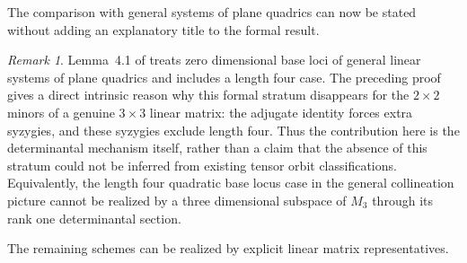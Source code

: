 \documentclass[11pt]{amsart}
\newcommand{\chg}[1]{#1}
\newcommand{\newrev}[1]{#1}
\theoremstyle{plain}
\theoremstyle{definition}
\theoremstyle{remark}
\newtheorem{remark}[theorem]{Remark}
\begin{document}
\chg{The comparison with general systems of plane quadrics can now be stated without adding an explanatory title to the formal result.}

\begin{remark}\label{rem:length-four}
Lemma~4.1 of \cite{GesmundoKeneshlou2026} treats \chg{zero dimensional} base loci of general linear systems of plane quadrics and includes a length four case. The preceding proof \newrev{gives a direct intrinsic reason} why this formal stratum disappears for the $2\times2$ minors of a genuine $3\times3$ linear matrix: the adjugate identity forces extra syzygies, and these syzygies exclude length four. \newrev{Thus the contribution here is the determinantal mechanism itself, rather than a claim that the absence of this stratum could not be inferred from existing tensor orbit classifications.} Equivalently, the \chg{length four quadratic base locus case} in the general collineation picture cannot be realized by a \chg{three dimensional} subspace of $M_3$ through its \chg{rank one} determinantal section.
\end{remark}

\chg{The remaining schemes can be realized by explicit linear matrix representatives.}
\end{document}

